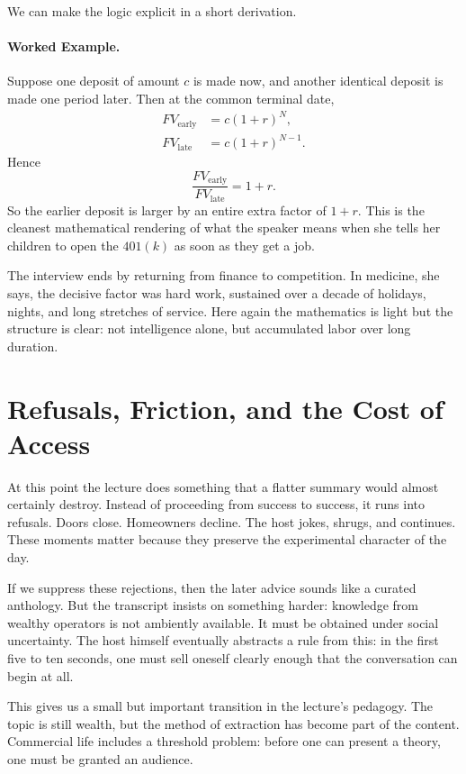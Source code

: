 We can make the logic explicit in a short derivation.

\paragraph{Worked Example.} Suppose one deposit of amount \(c\) is made now, and another identical deposit is made one period later. Then at the common terminal date,
\begin{align}
FV_{\text{early}} &= c(1+r)^N,\\
FV_{\text{late}} &= c(1+r)^{N-1}.
\end{align}
Hence
\begin{equation}
\frac{FV_{\text{early}}}{FV_{\text{late}}} = 1+r.
\end{equation}
So the earlier deposit is larger by an entire extra factor of \(1+r\). This is the cleanest mathematical rendering of what the speaker means when she tells her children to open the \(401(k)\) as soon as they get a job.

The interview ends by returning from finance to competition. In medicine, she says, the decisive factor was hard work, sustained over a decade of holidays, nights, and long stretches of service. Here again the mathematics is light but the structure is clear: not intelligence alone, but accumulated labor over long duration.

\section{Refusals, Friction, and the Cost of Access}

At this point the lecture does something that a flatter summary would almost certainly destroy. Instead of proceeding from success to success, it runs into refusals. Doors close. Homeowners decline. The host jokes, shrugs, and continues. These moments matter because they preserve the experimental character of the day.

If we suppress these rejections, then the later advice sounds like a curated anthology. But the transcript insists on something harder: knowledge from wealthy operators is not ambiently available. It must be obtained under social uncertainty. The host himself eventually abstracts a rule from this: in the first five to ten seconds, one must sell oneself clearly enough that the conversation can begin at all.

This gives us a small but important transition in the lecture's pedagogy. The topic is still wealth, but the method of extraction has become part of the content. Commercial life includes a threshold problem: before one can present a theory, one must be granted an audience.


